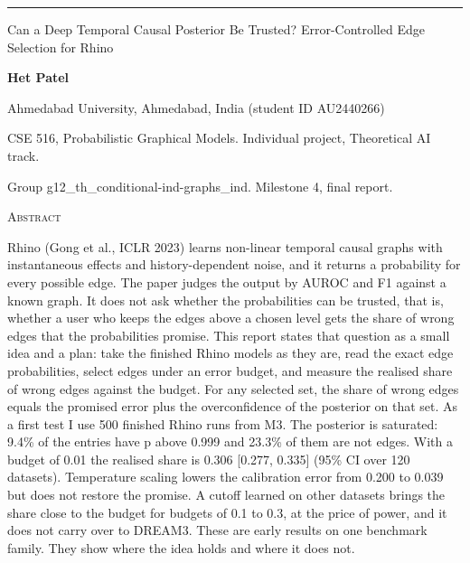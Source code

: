 \documentclass[10pt]{article}
\begin{document}
\thispagestyle{plain}
\noindent\rule{\textwidth}{4pt}\par\vspace{0.2in}
{\fontsize{17}{21}\selectfont\scshape\raggedright Can a Deep Temporal Causal Posterior Be Trusted? Error-Controlled Edge Selection for Rhino\par}\vspace{0.22in}
{\bfseries Het Patel}\par\vspace{2pt}
Ahmedabad University, Ahmedabad, India (student ID AU2440266)\par
CSE 516, Probabilistic Graphical Models. Individual project, Theoretical AI track.\par
Group g12\_th\_conditional-ind-graphs\_ind. Milestone 4, final report.\par
\vspace{0.12in}
\begin{center}{\large\scshape Abstract}\end{center}\vspace{-6pt}
\begin{list}{}{\setlength{\leftmargin}{0.5in}\setlength{\rightmargin}{0.5in}\setlength{\topsep}{0pt}}\item[]
\small Rhino (Gong et al., ICLR 2023) learns non-linear temporal causal graphs with instantaneous effects and history-dependent noise, and it returns a probability for every possible edge. The paper judges the output by AUROC and F1 against a known graph. It does not ask whether the probabilities can be trusted, that is, whether a user who keeps the edges above a chosen level gets the share of wrong edges that the probabilities promise. This report states that question as a small idea and a plan: take the finished Rhino models as they are, read the exact edge probabilities, select edges under an error budget, and measure the realised share of wrong edges against the budget. For any selected set, the share of wrong edges equals the promised error plus the overconfidence of the posterior on that set. As a first test I use 500 finished Rhino runs from M3. The posterior is saturated: 9.4\% of the entries have p above 0.999 and 23.3\% of them are not edges. With a budget of 0.01 the realised share is 0.306 [0.277, 0.335] (95\% CI over 120 datasets). Temperature scaling lowers the calibration error from 0.200 to 0.039 but does not restore the promise. A cutoff learned on other datasets brings the share close to the budget for budgets of 0.1 to 0.3, at the price of power, and it does not carry over to DREAM3. These are early results on one benchmark family. They show where the idea holds and where it does not.
\end{list}
\end{document}
